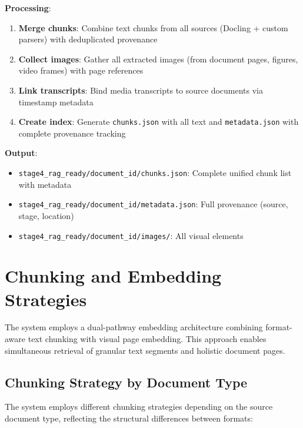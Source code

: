 \textbf{Processing}:

\begin{enumerate}
    \item \textbf{Merge chunks}: Combine text chunks from all sources (Docling + custom parsers) with deduplicated provenance
    \item \textbf{Collect images}: Gather all extracted images (from document pages, figures, video frames) with page references
    \item \textbf{Link transcripts}: Bind media transcripts to source documents via timestamp metadata
    \item \textbf{Create index}: Generate \texttt{chunks.json} with all text and \texttt{metadata.json} with complete provenance tracking
\end{enumerate}

\textbf{Output}:
\begin{itemize}
    \item \texttt{stage4\_rag\_ready/document\_id/chunks.json}: Complete unified chunk list with metadata
    \item \texttt{stage4\_rag\_ready/document\_id/metadata.json}: Full provenance (source, stage, location)
    \item \texttt{stage4\_rag\_ready/document\_id/images/}: All visual elements
\end{itemize}

\section{Chunking and Embedding Strategies}

The system employs a dual-pathway embedding architecture combining format-aware text chunking with visual page embedding. This approach enables simultaneous retrieval of granular text segments and holistic document pages.

\subsection{Chunking Strategy by Document Type}

The system employs different chunking strategies depending on the source document type, reflecting the structural differences between formats:


